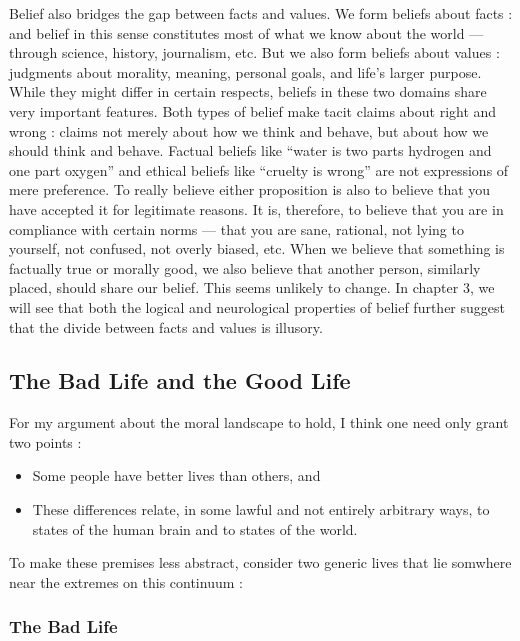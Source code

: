 \documentclass[a4paper,12pt]{extbook}
\begin{document}
Belief also bridges the gap between facts and values. 
We form beliefs about facts : 
and belief in this sense constitutes most of what we know about the world --- through science, history, journalism, etc. 
But we also form beliefs about values : 
judgments about morality, meaning, personal goals, and life’s larger purpose. 
While they might differ in certain respects, beliefs in these two domains share very important features. 
Both types of belief make tacit claims about right and wrong : 
claims not merely about how we think and behave, but about how we should think and behave. 
Factual beliefs like ``water is two parts hydrogen and one part oxygen'' and ethical beliefs like ``cruelty is wrong'' are not expressions of mere preference. 
To really believe either proposition is also to believe that you have accepted it for legitimate reasons. 
It is, therefore, to believe that you are in compliance with certain norms --- that you are sane, rational, not lying to yourself, not confused, not overly biased, etc. 
When we believe that something is factually true or morally good, we also believe that another person, similarly placed, should share our belief. 
This seems unlikely to change. 
In chapter 3, we will see that both the logical and neurological properties of belief further suggest that the divide between facts and values is illusory. 

\subsection{The Bad Life and the Good Life}

For my argument about the moral landscape to hold, I think one need only grant two points :

\begin{itemize}
    \item Some people have better lives than others, and
    \item These differences relate, in some lawful and not entirely arbitrary ways, to states of the human brain and to states of the world.
\end{itemize}

To make these premises less abstract, consider two generic lives that lie somwhere near the extremes on this continuum :

\subsubsection{The Bad Life}
\end{document}
